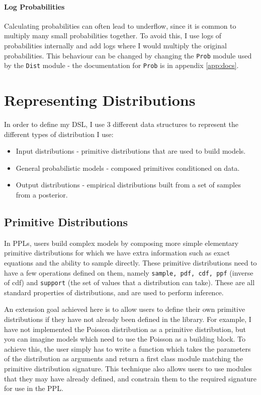 \paragraph{Log Probabilities} 
Calculating probabilities can often lead to underflow, since it is common to multiply many small probabilities together. To avoid this, I use logs of probabilities internally and add logs where I would multiply the original probabilities. This behaviour can be changed by changing the \texttt{Prob} module used by the \texttt{Dist} module - the documentation for \texttt{Prob} is in appendix \ref{app:docs}.
	
\section{Representing Distributions}
In order to define my DSL, I use 3 different data structures to represent the different types of distribution I use:
\begin{itemize}
	\item Input distributions - primitive distributions that are used to build models.
	\item General probabilistic models - composed primitives conditioned on data.
	\item Output distributions - empirical distributions built from a set of samples from a posterior.
\end{itemize}
\vspace{2mm}
\subsection{Primitive Distributions}
In PPLs, users build complex models by composing more simple elementary primitive distributions for which we have extra information such as exact equations and the ability to sample directly. These primitive distributions need to have a few operations defined on them, namely \texttt{sample, pdf, cdf, ppf} (inverse of cdf) and \texttt{support} (the set of values that a distribution can take). These are all standard properties of distributions, and are used to perform inference.

An extension goal achieved here is to allow users to define their own primitive distributions if they have not already been defined in the library. For example, I have not implemented the Poisson distribution as a primitive distribution, but you can imagine models which need to use the Poisson as a building block. To achieve this, the user simply has to write a function which takes the parameters of the distribution as arguments and return a first class module matching the primitive distribution signature. This technique also allows users to use modules that they may have already defined, and constrain them to the required signature for use in the PPL.
	
